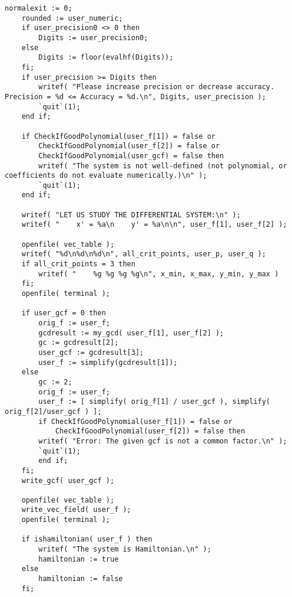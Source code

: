 \documentclass[a4paper,10pt]{article}
\begin{document}
\begin{lstlisting}[name=main]
    normalexit := 0;
    rounded := user_numeric;
    if user_precision0 <> 0 then
        Digits := user_precision0;
    else
        Digits := floor(evalhf(Digits));
    fi;
    if user_precision >= Digits then
        writef( "Please increase precision or decrease accuracy. Precision = %d <= Accuracy = %d.\n", Digits, user_precision );
        `quit`(1);
    end if;

    if CheckIfGoodPolynomial(user_f[1]) = false or
        CheckIfGoodPolynomial(user_f[2]) = false or
        CheckIfGoodPolynomial(user_gcf) = false then
        writef( "The system is not well-defined (not polynomial, or coefficients do not evaluate numerically.)\n" );
        `quit`(1);
    end if;

    writef( "LET US STUDY THE DIFFERENTIAL SYSTEM:\n" );
    writef( "    x' = %a\n    y' = %a\n\n", user_f[1], user_f[2] );

    openfile( vec_table );
    writef( "%d\n%d\n%d\n", all_crit_points, user_p, user_q );
    if all_crit_points = 3 then
        writef( "    %g %g %g %g\n", x_min, x_max, y_min, y_max )
    fi;
    openfile( terminal );

    if user_gcf = 0 then
        orig_f := user_f;
        gcdresult := my_gcd( user_f[1], user_f[2] );
        gc := gcdresult[2];
        user_gcf := gcdresult[3];
        user_f := simplify(gcdresult[1]);
    else
        gc := 2;
        orig_f := user_f;
        user_f := [ simplify( orig_f[1] / user_gcf ), simplify( orig_f[2]/user_gcf ) ];
        if CheckIfGoodPolynomial(user_f[1]) = false or
            CheckIfGoodPolynomial(user_f[2]) = false then
        writef( "Error: The given gcf is not a common factor.\n" );
        `quit`(1);
        end if;
    fi;
    write_gcf( user_gcf );

    openfile( vec_table );
    write_vec_field( user_f );
    openfile( terminal );

    if ishamiltonian( user_f ) then
        writef( "The system is Hamiltonian.\n" );
        hamiltonian := true
    else
        hamiltonian := false
    fi;


\end{lstlisting}
\end{document}
